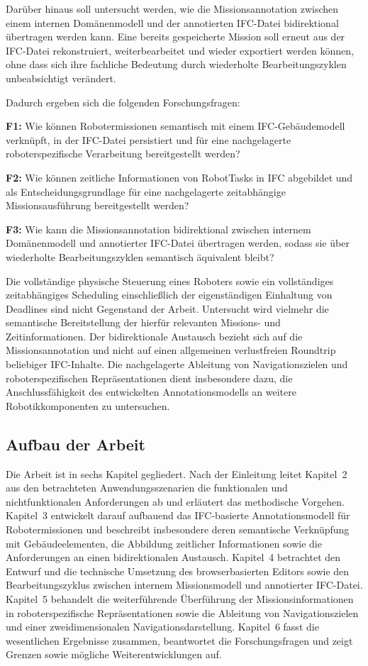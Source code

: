 Darüber hinaus soll untersucht werden, wie die Missionsannotation zwischen einem internen
Domänenmodell und der annotierten IFC-Datei bidirektional übertragen werden kann. Eine bereits
gespeicherte Mission soll erneut aus der IFC-Datei rekonstruiert, weiterbearbeitet und wieder
exportiert werden können, ohne dass sich ihre fachliche Bedeutung durch wiederholte
Bearbeitungszyklen unbeabsichtigt verändert.

Dadurch ergeben sich die folgenden Forschungsfragen:

\textbf{F1:} Wie können Robotermissionen semantisch mit einem IFC-Gebäudemodell verknüpft, in der
IFC-Datei persistiert und für eine nachgelagerte roboterspezifische Verarbeitung bereitgestellt
werden?

\textbf{F2:} Wie können zeitliche Informationen von RobotTasks in IFC abgebildet und als Entscheidungsgrundlage für eine nachgelagerte zeitabhängige Missionsausführung bereitgestellt werden?

\textbf{F3:} Wie kann die Missionsannotation bidirektional zwischen internem Domänenmodell und
annotierter IFC-Datei übertragen werden, sodass sie über wiederholte Bearbeitungszyklen semantisch
äquivalent bleibt?

Die vollständige physische Steuerung eines Roboters sowie ein vollständiges zeitabhängiges
Scheduling einschließlich der eigenständigen Einhaltung von Deadlines sind nicht Gegenstand der
Arbeit. Untersucht wird vielmehr die semantische Bereitstellung der hierfür relevanten Missions- und
Zeitinformationen. Der bidirektionale Austausch bezieht sich auf die Missionsannotation und nicht
auf einen allgemeinen verlustfreien Roundtrip beliebiger IFC-Inhalte. Die nachgelagerte Ableitung
von Navigationszielen und roboterspezifischen Repräsentationen dient insbesondere dazu, die
Anschlussfähigkeit des entwickelten Annotationsmodells an weitere Robotikkomponenten zu untersuchen.

\subsection{Aufbau der Arbeit}

Die Arbeit ist in sechs Kapitel gegliedert. Nach der Einleitung leitet Kapitel~2 aus den betrachteten
Anwendungsszenarien die funktionalen und nichtfunktionalen Anforderungen ab und erläutert das
methodische Vorgehen. Kapitel~3 entwickelt darauf aufbauend das IFC-basierte Annotationsmodell für
Robotermissionen und beschreibt insbesondere deren semantische Verknüpfung mit Gebäudeelementen,
die Abbildung zeitlicher Informationen sowie die Anforderungen an einen bidirektionalen Austausch.
Kapitel~4 betrachtet den Entwurf und die technische Umsetzung des browserbasierten Editors sowie
den Bearbeitungszyklus zwischen internem Missionsmodell und annotierter IFC-Datei. Kapitel~5
behandelt die weiterführende Überführung der Missionsinformationen in roboterspezifische
Repräsentationen sowie die Ableitung von Navigationszielen und einer zweidimensionalen
Navigationsdarstellung. Kapitel~6 fasst die wesentlichen Ergebnisse zusammen, beantwortet die
Forschungsfragen und zeigt Grenzen sowie mögliche Weiterentwicklungen auf.
